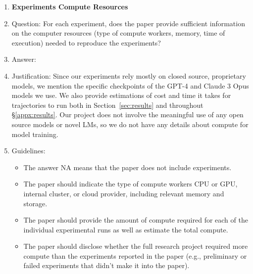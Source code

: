 \begin{enumerate}
\item {\bf Experiments Compute Resources}
    \item[] Question: For each experiment, does the paper provide sufficient information on the computer resources (type of compute workers, memory, time of execution) needed to reproduce the experiments?
    \item[] Answer: \answerYes{}
    \item[] Justification: Since our experiments rely mostly on closed source, proprietary models, we mention the specific checkpoints of the GPT-4 and Claude 3 Opus models we use. We also provide estimations of cost and time it takes for trajectories to run both in Section~\ref{sec:results} and throughout \S\ref{appx:results}. Our project does not involve the meaningful use of any open source models or novel LMs, so we do not have any details about compute for model training.
    \item[] Guidelines:
    \begin{itemize}
        \item The answer NA means that the paper does not include experiments.
        \item The paper should indicate the type of compute workers CPU or GPU, internal cluster, or cloud provider, including relevant memory and storage.
        \item The paper should provide the amount of compute required for each of the individual experimental runs as well as estimate the total compute. 
        \item The paper should disclose whether the full research project required more compute than the experiments reported in the paper (e.g., preliminary or failed experiments that didn't make it into the paper). 
    \end{itemize}
    

\end{enumerate}
